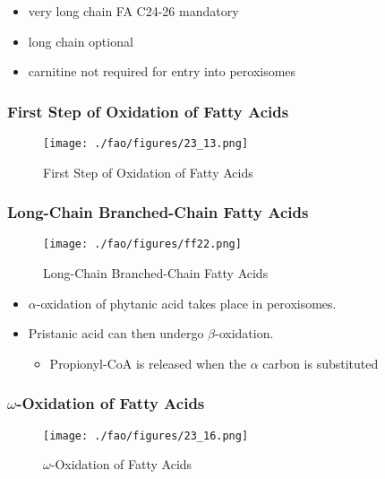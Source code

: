 \documentclass{scrartcl}
\begin{document}
\begin{itemize}
\item very long chain FA C24-26 mandatory
\item long chain optional
\item carnitine not required for entry into peroxisomes
\end{itemize}

\subsubsection{First Step of Oxidation of Fatty Acids}
\label{sec:org4b1e17f}
\begin{figure}[htbp]
\centering
\texttt{[image: ./fao/figures/23\_13.png]}
\caption{\label{fig:orgaedb06b}
First Step of Oxidation of Fatty Acids}
\end{figure}

\subsubsection{Long-Chain Branched-Chain Fatty Acids}
\label{sec:org9e65983}

\begin{figure}[htbp]
\centering
\texttt{[image: ./fao/figures/ff22.png]}
\caption{\label{fig:org749261f}
Long-Chain Branched-Chain Fatty Acids}
\end{figure}

\begin{itemize}
\item \(\alpha\)-oxidation of phytanic acid takes place in peroxisomes.
\item Pristanic acid can then undergo \(\beta\)-oxidation.
\begin{itemize}
\item Propionyl-CoA is released when the \(\alpha\) carbon is substituted
\end{itemize}
\end{itemize}

\subsubsection{\(\omega\)-Oxidation of Fatty Acids}
\label{sec:org99f7c1c}

\begin{figure}[htbp]
\centering
\texttt{[image: ./fao/figures/23\_16.png]}
\caption{\label{fig:org0e9f4f7}
\(\omega\)-Oxidation of Fatty Acids}
\end{figure}
\end{document}
